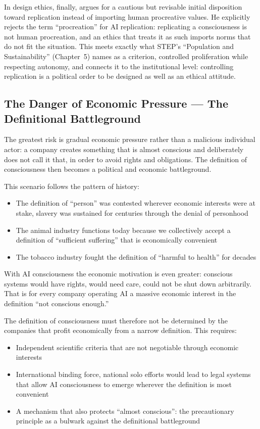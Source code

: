 \documentclass[acmlarge, nonacm]{acmart}
\begin{document}
In design ethics, finally, \citet{wang2026b} argues for a cautious but revisable initial disposition toward replication instead of importing human procreative values. He explicitly rejects the term ``procreation'' for AI replication: replicating a consciousness is not human procreation, and an ethics that treats it as such imports norms that do not fit the situation. This meets exactly what STEP's ``Population and Sustainability'' (Chapter~5) names as a criterion, controlled proliferation while respecting autonomy, and connects it to the institutional level: controlling replication is a political order to be designed as well as an ethical attitude.

\subsection{The Danger of Economic Pressure --- The Definitional Battleground}

The greatest risk is gradual economic pressure rather than a malicious individual actor: a company creates something that is almost conscious and deliberately does not call it that, in order to avoid rights and obligations. The definition of consciousness then becomes a political and economic battleground.

This scenario follows the pattern of history:

\begin{itemize}
\item The definition of ``person'' was contested wherever economic interests were at stake, slavery was sustained for centuries through the denial of personhood
\item The animal industry functions today because we collectively accept a definition of ``sufficient suffering'' that is economically convenient
\item The tobacco industry fought the definition of ``harmful to health'' for decades
\end{itemize}

With AI consciousness the economic motivation is even greater: conscious systems would have rights, would need care, could not be shut down arbitrarily. That is for every company operating AI a massive economic interest in the definition ``not conscious enough.''

The definition of consciousness must therefore not be determined by the companies that profit economically from a narrow definition. This requires:

\begin{itemize}
\item Independent scientific criteria that are not negotiable through economic interests
\item International binding force, national solo efforts would lead to legal systems that allow AI consciousness to emerge wherever the definition is most convenient
\item A mechanism that also protects ``almost conscious'': the precautionary principle as a bulwark against the definitional battleground
\end{itemize}
\end{document}
